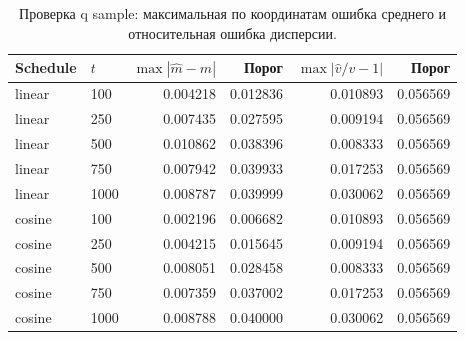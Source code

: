 \begin{table}[H]\centering\footnotesize
\setlength{\tabcolsep}{4pt}
\caption{Проверка q sample: максимальная по координатам ошибка среднего и относительная ошибка дисперсии.}\label{tab:moments}
\begin{tabular}{llrrrr}
\toprule
Schedule & $t$ & $\max|\hat m-m|$ & Порог & $\max|\hat v/v-1|$ & Порог \\
\midrule
linear & 100 & 0.004218 & 0.012836 & 0.010893 & 0.056569 \\
linear & 250 & 0.007435 & 0.027595 & 0.009194 & 0.056569 \\
linear & 500 & 0.010862 & 0.038396 & 0.008333 & 0.056569 \\
linear & 750 & 0.007942 & 0.039933 & 0.017253 & 0.056569 \\
linear & 1000 & 0.008787 & 0.039999 & 0.030062 & 0.056569 \\
cosine & 100 & 0.002196 & 0.006682 & 0.010893 & 0.056569 \\
cosine & 250 & 0.004215 & 0.015645 & 0.009194 & 0.056569 \\
cosine & 500 & 0.008051 & 0.028458 & 0.008333 & 0.056569 \\
cosine & 750 & 0.007359 & 0.037002 & 0.017253 & 0.056569 \\
cosine & 1000 & 0.008788 & 0.040000 & 0.030062 & 0.056569 \\
\bottomrule
\end{tabular}
\end{table}
